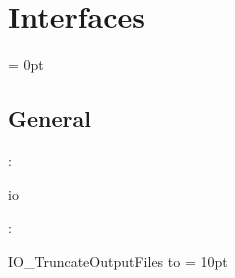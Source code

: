 
\section{Interfaces} 


\parskip = 0pt

\vspace{3mm} \subsection*{General}

: 

io
\vspace{2mm}

\vspace{5mm}

: 



IO\_TruncateOutputFiles to 
\vspace{2mm}\parskip = 10pt 
